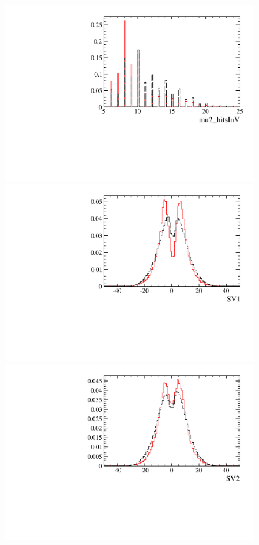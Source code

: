 \begin{figure} [htb!]
\begin{center}
\includegraphics[scale=0.20]{figs/mu2_hitsInVPARTIAL2pipi.pdf}
\includegraphics[scale=0.20]{figs/SV1PARTIAL2pipi.pdf}
\includegraphics[scale=0.20]{figs/SV2PARTIAL2pipi.pdf}

\end{center}
\end{figure}
